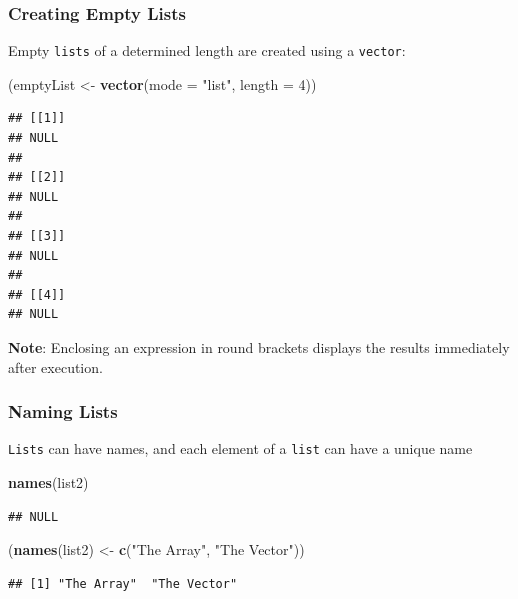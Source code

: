 \documentclass[]{book}
\newenvironment{Shaded}{\begin{snugshade}}{\end{snugshade}}
\newcommand{\DataTypeTok}[1]{\textcolor[rgb]{0.13,0.29,0.53}{#1}}
\newcommand{\DecValTok}[1]{\textcolor[rgb]{0.00,0.00,0.81}{#1}}
\newcommand{\KeywordTok}[1]{\textcolor[rgb]{0.13,0.29,0.53}{\textbf{#1}}}
\newcommand{\NormalTok}[1]{#1}
\newcommand{\StringTok}[1]{\textcolor[rgb]{0.31,0.60,0.02}{#1}}
\theoremstyle{definition}
\theoremstyle{definition}
\theoremstyle{definition}
\theoremstyle{remark}
\begin{document}
\hypertarget{creating-empty-lists}{%
\subsubsection{Creating Empty Lists}\label{creating-empty-lists}}

Empty \texttt{lists} of a determined length are created using a
\texttt{vector}:

\begin{Shaded}
\begin{Highlighting}[]
\NormalTok{(emptyList <-}\StringTok{ }\KeywordTok{vector}\NormalTok{(}\DataTypeTok{mode =} \StringTok{"list"}\NormalTok{, }\DataTypeTok{length =} \DecValTok{4}\NormalTok{))}
\end{Highlighting}
\end{Shaded}

\begin{verbatim}
## [[1]]
## NULL
## 
## [[2]]
## NULL
## 
## [[3]]
## NULL
## 
## [[4]]
## NULL
\end{verbatim}

\textbf{Note}: Enclosing an expression in round brackets displays the
results immediately after execution.

\hypertarget{naming-lists}{%
\subsubsection{Naming Lists}\label{naming-lists}}

\texttt{Lists} can have names, and each element of a \texttt{list} can
have a unique name

\begin{Shaded}
\begin{Highlighting}[]
\KeywordTok{names}\NormalTok{(list2)}
\end{Highlighting}
\end{Shaded}

\begin{verbatim}
## NULL
\end{verbatim}

\begin{Shaded}
\begin{Highlighting}[]
\NormalTok{(}\KeywordTok{names}\NormalTok{(list2) <-}\StringTok{ }\KeywordTok{c}\NormalTok{(}\StringTok{"The Array"}\NormalTok{, }\StringTok{"The Vector"}\NormalTok{))}
\end{Highlighting}
\end{Shaded}

\begin{verbatim}
## [1] "The Array"  "The Vector"
\end{verbatim}
\end{document}
